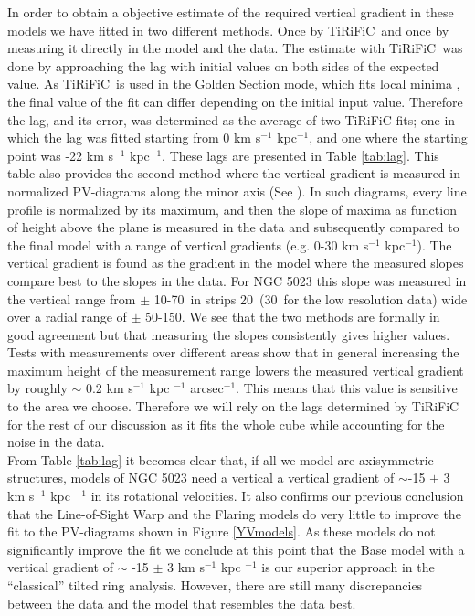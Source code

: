 \documentclass[useAMS,usenatbib]{mn2e}
\newcommand\tiri{{\sc TiRiFiC}}
\begin{document}
\indent In order to obtain a objective estimate of the required vertical gradient in these models we have fitted in two different methods. Once by \tiri\ and once by measuring it directly in the model and the data.  The estimate with \tiri\ was done by approaching the lag with initial values on both sides of the expected value. As \tiri\  is used in the Golden Section mode, which fits local minima  \citep[See][]{Joshtirific2007}, the final value of the fit can differ depending on the initial input value. Therefore the lag, and its error,  was determined as the average of two {\sc TiRiFiC} fits; one in which the lag was fitted starting from 0 km s$^{-1}$ kpc$^{-1}$,  and one where the starting point was -22  km s$^{-1}$ kpc$^{-1}$. These lags are presented in Table \ref{tab:lag}. This table also provides the second method where the vertical gradient is measured in normalized PV-diagrams along the minor axis (See \cite{Kamphuis2007a,Kamphuis2011}). In such diagrams, every line profile is normalized by its maximum, and then the slope of maxima as function of height above the plane is measured in the data and subsequently compared to the final model with a range of vertical gradients (e.g. 0-30 km s$^{-1}$ kpc$^{-1}$). The vertical gradient is  found as the gradient in the model where the measured slopes compare best  to the slopes in the data. For NGC 5023 this slope was measured in the vertical range from $\pm$ 10-70\arcsec\  in strips 20\arcsec\ (30\arcsec\ for the low resolution data) wide over a radial range of $\pm$ 50-150\arcsec.  We see that the two methods are formally in good agreement but that measuring the slopes consistently gives higher values. Tests with measurements over different areas show that in general increasing the maximum height of the measurement range lowers the measured vertical gradient by roughly $\sim$ 0.2  km s$^{-1}$ kpc $^{-1}$ arcsec$^{-1}$.  This means that this value is sensitive to the area we choose. Therefore we will rely on the lags determined by {\sc TiRiFiC} for the rest of our discussion as it fits the whole cube while accounting for the noise in the data.\\  
\indent From Table \ref{tab:lag} it becomes clear that, if all we model are axisymmetric structures, models of NGC 5023 need a vertical a vertical gradient of $\sim$-15 $\pm$ 3  km s$^{-1}$ kpc $^{-1}$ in its rotational velocities.  It also confirms our previous conclusion that  the Line-of-Sight Warp and the Flaring models do very little to improve the fit to  the PV-diagrams shown in Figure \ref{YVmodels}. As these models do not significantly improve the fit we conclude at this point that the Base model with a vertical gradient of  $\sim$ -15 $\pm$ 3  km s$^{-1}$ kpc $^{-1}$ is our superior approach in the ``classical'' tilted ring analysis. However, there are still many discrepancies between the data and the model that resembles the data best.\\
\end{document}

